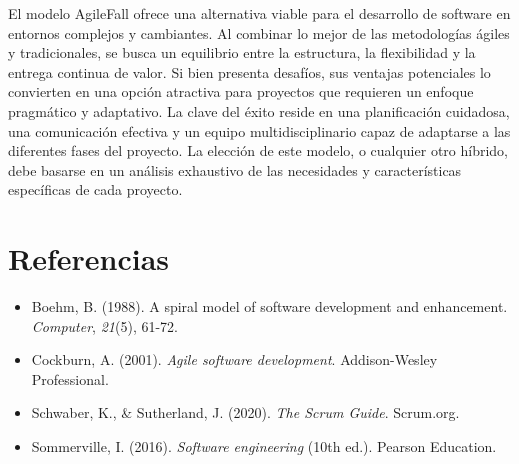 \documentclass[12pt, spanish]{article}
\begin{document}
El modelo AgileFall ofrece una alternativa viable para el desarrollo de software en entornos complejos y cambiantes. Al combinar lo mejor de las metodologías ágiles y tradicionales, se busca un equilibrio entre la estructura, la flexibilidad y la entrega continua de valor. Si bien presenta desafíos, sus ventajas potenciales lo convierten en una opción atractiva para proyectos que requieren un enfoque pragmático y adaptativo. La clave del éxito reside en una planificación cuidadosa, una comunicación efectiva y un equipo multidisciplinario capaz de adaptarse a las diferentes fases del proyecto. La elección de este modelo, o cualquier otro híbrido, debe basarse en un análisis exhaustivo de las necesidades y características específicas de cada proyecto.

\section*{Referencias}

\begin{itemize}
    \item Boehm, B. (1988). A spiral model of software development and enhancement. \textit{Computer}, \textit{21}(5), 61-72.
    \item Cockburn, A. (2001). \textit{Agile software development}. Addison-Wesley Professional.
    \item Schwaber, K., & Sutherland, J. (2020). \textit{The Scrum Guide}. Scrum.org.
    \item Sommerville, I. (2016). \textit{Software engineering} (10th ed.). Pearson Education.
\end{itemize}
\end{document}
